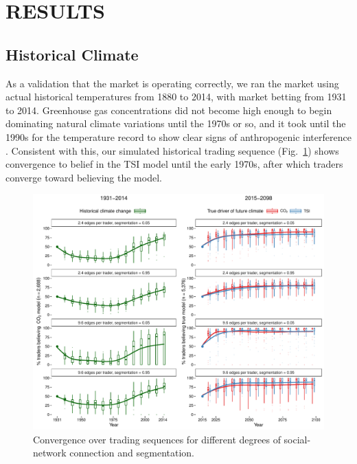 \documentclass{wscpaperproc}\usepackage[]{graphicx}\usepackage[]{color}
\makeatletter
\def\maxwidth{ %
  \ifdim\Gin@nat@width>\linewidth
    \linewidth
  \else
    \Gin@nat@width
  \fi
}
\newenvironment{knitrout}{}{} %
\makeatother
\begin{document}
\section{RESULTS}

\subsection{Historical Climate}

As a validation that the market is operating correctly, we ran the market using actual historical temperatures from 1880 to 2014, with market betting from 1931 to 2014. Greenhouse gas concentrations did not become high enough to begin dominating natural climate variations until the 1970s or so, and it took until the 1990s for the temperature record to show clear signs of anthropogenic interference . Consistent with this, our simulated historical trading sequence (Fig.~\ref{fig:time}) shows convergence to belief in the TSI model until the early 1970s, after which traders converge toward believing the  model.
\begin{knitrout}
\color{fgcolor}\begin{figure}[t]

{\centering \includegraphics[width=\maxwidth]{figure/time-1} 

}

\caption[Convergence over trading sequences for different degrees of social-network connection and segmentation]{Convergence over trading sequences for different degrees of social-network connection and segmentation.}\label{fig:time}
\end{figure}


\end{knitrout}
\end{document}

